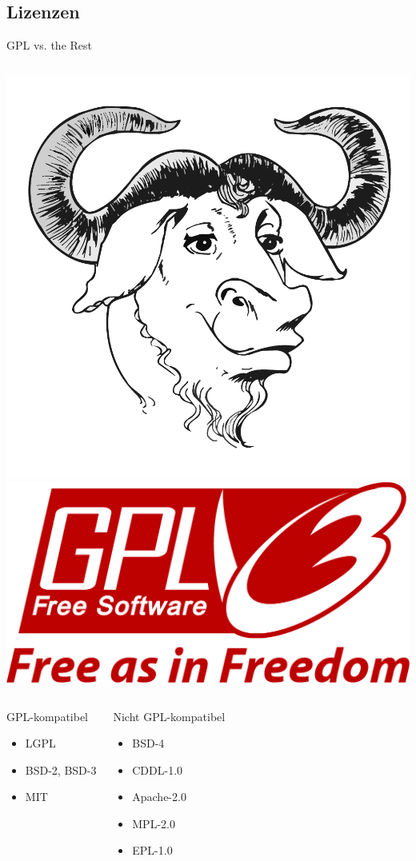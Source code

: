 \documentclass[pdflatex, ngerman]{beamer}
\begin{document}
\subsection*{Lizenzen}

\begin{frame}{GPL vs. the Rest}
\begin{columns}
\centering\includegraphics[width=0.5\columnwidth]{Official_gnu}
\centering\includegraphics[width=0.5\columnwidth]{GPLv3_Logo}
\end{columns}
\begin{columns}
\begin{block}{GPL-kompatibel}
  \begin{itemize}
    \item LGPL
    \item BSD-2, BSD-3
    \item MIT
  \end{itemize}
\end{block}
\begin{block}{Nicht GPL-kompatibel}
  \begin{itemize}
    \item BSD-4
    \item CDDL-1.0
    \item Apache-2.0
    \item MPL-2.0
    \item EPL-1.0
  \end{itemize}
\end{block}
\end{columns}
\end{frame}
\end{document}
